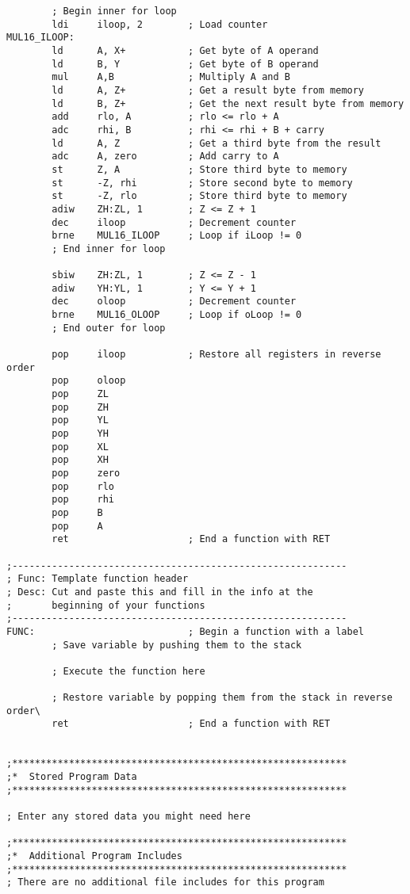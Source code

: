 \documentclass[12pt,letterpaper]{article}
\begin{document}
\begin{verbatim}
        ; Begin inner for loop
        ldi     iloop, 2        ; Load counter
MUL16_ILOOP:
        ld      A, X+           ; Get byte of A operand
        ld      B, Y            ; Get byte of B operand
        mul     A,B             ; Multiply A and B
        ld      A, Z+           ; Get a result byte from memory
        ld      B, Z+           ; Get the next result byte from memory
        add     rlo, A          ; rlo <= rlo + A
        adc     rhi, B          ; rhi <= rhi + B + carry
        ld      A, Z            ; Get a third byte from the result
        adc     A, zero         ; Add carry to A
        st      Z, A            ; Store third byte to memory
        st      -Z, rhi         ; Store second byte to memory
        st      -Z, rlo         ; Store third byte to memory
        adiw    ZH:ZL, 1        ; Z <= Z + 1            
        dec     iloop           ; Decrement counter
        brne    MUL16_ILOOP     ; Loop if iLoop != 0
        ; End inner for loop

        sbiw    ZH:ZL, 1        ; Z <= Z - 1
        adiw    YH:YL, 1        ; Y <= Y + 1
        dec     oloop           ; Decrement counter
        brne    MUL16_OLOOP     ; Loop if oLoop != 0
        ; End outer for loop
                
        pop     iloop           ; Restore all registers in reverse order
        pop     oloop
        pop     ZL              
        pop     ZH
        pop     YL
        pop     YH
        pop     XL
        pop     XH
        pop     zero
        pop     rlo
        pop     rhi
        pop     B
        pop     A
        ret                     ; End a function with RET

;-----------------------------------------------------------
; Func: Template function header
; Desc: Cut and paste this and fill in the info at the 
;       beginning of your functions
;-----------------------------------------------------------
FUNC:                           ; Begin a function with a label
        ; Save variable by pushing them to the stack

        ; Execute the function here
        
        ; Restore variable by popping them from the stack in reverse order\
        ret                     ; End a function with RET


;***********************************************************
;*  Stored Program Data
;***********************************************************

; Enter any stored data you might need here

;***********************************************************
;*  Additional Program Includes
;***********************************************************
; There are no additional file includes for this program
\end{verbatim}
\end{document}
